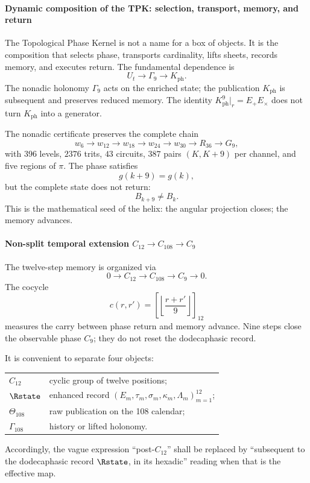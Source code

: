 \paragraph{Dynamic composition of the TPK: selection, transport, memory, and return}

The Topological Phase Kernel is not a name for a box of objects. It is the
composition that selects phase, transports cardinality, lifts sheets,
records memory, and executes return. The fundamental dependence is
\[
U_t\longrightarrow\Gamma_9\longrightarrow K_{\mathrm{ph}}.
\]
The nonadic holonomy \(\Gamma_9\) acts on the enriched state; the
publication \(K_{\mathrm{ph}}\) is subsequent and preserves reduced memory. The
identity \(K_{\mathrm{ph}}^9|_r=E_+E_\times\) does not turn \(K_{\mathrm{ph}}\) into a
generator.

The nonadic certificate preserves the complete chain
\[
w_6\to w_{12}\to w_{18}\to w_{24}\to w_{30}
\to R_{36}\to G_9,
\]
with \(396\) levels, \(2376\) trits, \(43\) circuits, \(387\) pairs
\((K,K+9)\) per channel, and five regions of \(\pi\). The phase satisfies
\[
g(k+9)=g(k),
\]
but the complete state does not return:
\[
B_{k+9}\ne B_k.
\]
This is the mathematical seed of the helix: the angular projection closes; the
memory advances.

\paragraph{Non-split temporal extension \(C_{12}\to C_{108}\to C_9\)}

The twelve-step memory is organized via
\begin{equation}
0\longrightarrow C_{12}\longrightarrow C_{108}
\longrightarrow C_9\longrightarrow0.
\label{eq:extension-108}
\end{equation}
The cocycle
\[
c(r,r')=\left[\left\lfloor\frac{r+r'}9\right\rfloor\right]_{12}
\]
measures the carry between phase return and memory advance. Nine steps close
the observable phase \(C_9\); they do not reset the dodecaphasic
record.

It is convenient to separate four objects:
\begin{center}
\begin{tabularx}{.95\textwidth}{>{\bfseries}l X}
\toprule
\(C_{12}\) & cyclic group of twelve positions;\\
\(\Rstate\) & enhanced record \((E_m,\tau_m,\sigma_m,\kappa_m,\Lambda_m)_{m=1}^{12}\);\\
\(\Theta_{108}\) & raw publication on the 108 calendar;\\
\(\Gamma_{108}\) & history or lifted holonomy.\\
\bottomrule
\end{tabularx}
\end{center}
Accordingly, the vague expression
\enquote{post-\(C_{12}\)} shall be replaced by
\enquote{subsequent to the dodecaphasic record
\(\Rstate\), in its hexadic} reading when that is the effective
map.


